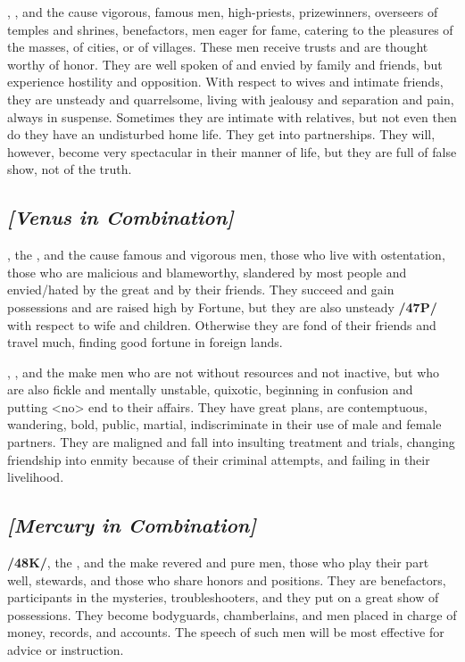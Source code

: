 \Jupiter, \Venus, and the \Moon\xspace cause vigorous, famous men, high-priests, prizewinners, overseers of temples and shrines, benefactors, men eager for fame, catering to the pleasures of the masses, of cities, or of villages. These men receive trusts and are thought worthy of honor. They are well spoken of and envied by family and friends, but experience hostility and opposition. With respect to wives and intimate friends, they are unsteady and quarrelsome, living with jealousy and separation and pain, always in suspense. Sometimes they are intimate with relatives, but not even then do they have an undisturbed home life. They get into partnerships. They will, however, become very spectacular in their manner of life, but they are full of false show, not of the truth.

\secbr
{}
\subsection{\textit{[Venus in Combination]}}
\Venus, the \Sun, and the \Moon\xspace cause famous and vigorous men, those who live with ostentation, those who are malicious and blameworthy, slandered by most people and envied/hated by the great and by their friends. They succeed and gain possessions and are raised high by Fortune, but they are also unsteady
\textbf{/47P/} with respect to wife and children. Otherwise they are fond of their friends and travel much, finding
good fortune in foreign lands.

\Venus, \Mars, and the \Moon\xspace make men who are not without resources and not inactive, but who are also fickle and mentally unstable, quixotic, beginning in confusion and putting <no> end to their affairs. They have great plans, are contemptuous, wandering, bold, public, martial, indiscriminate in their use of male and female partners. They are maligned and fall into insulting treatment and trials, changing friendship into enmity because of their criminal attempts, and failing in their livelihood.

\secbr
{}
\subsection{\textit{[Mercury in Combination]}}
\textbf{/48K/}\Mercury, the \Sun, and the \Moon\xspace make revered and pure men, those who play their part well, stewards, and those who share honors and positions. They are benefactors, participants in the mysteries, troubleshooters, and they put on a great show of possessions. They become bodyguards, chamberlains, and men placed in charge of money, records, and accounts. The speech of such men will be most effective for advice or instruction.

